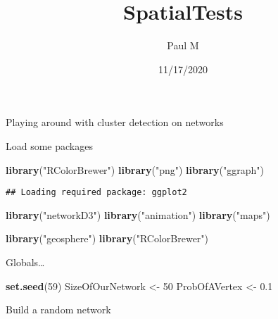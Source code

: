 \documentclass[]{article}
\title{SpatialTests}
\author{Paul M}
\date{11/17/2020}
\newenvironment{Shaded}{\begin{snugshade}}{\end{snugshade}}
\newcommand{\DecValTok}[1]{\textcolor[rgb]{0.00,0.00,0.81}{#1}}
\newcommand{\FloatTok}[1]{\textcolor[rgb]{0.00,0.00,0.81}{#1}}
\newcommand{\KeywordTok}[1]{\textcolor[rgb]{0.13,0.29,0.53}{\textbf{#1}}}
\newcommand{\NormalTok}[1]{#1}
\newcommand{\StringTok}[1]{\textcolor[rgb]{0.31,0.60,0.02}{#1}}
\begin{document}
\maketitle

Playing around with cluster detection on networks

Load some packages

\begin{Shaded}
\begin{Highlighting}[]
\KeywordTok{library}\NormalTok{(}\StringTok{"RColorBrewer"}\NormalTok{) }
\KeywordTok{library}\NormalTok{(}\StringTok{"png"}\NormalTok{)}
\KeywordTok{library}\NormalTok{(}\StringTok{"ggraph"}\NormalTok{)}
\end{Highlighting}
\end{Shaded}

\begin{verbatim}
## Loading required package: ggplot2
\end{verbatim}

\begin{Shaded}
\begin{Highlighting}[]
\KeywordTok{library}\NormalTok{(}\StringTok{"networkD3"}\NormalTok{)}
\KeywordTok{library}\NormalTok{(}\StringTok{"animation"}\NormalTok{)}
\KeywordTok{library}\NormalTok{(}\StringTok{"maps"}\NormalTok{)}

\KeywordTok{library}\NormalTok{(}\StringTok{"geosphere"}\NormalTok{)}
\KeywordTok{library}\NormalTok{(}\StringTok{"RColorBrewer"}\NormalTok{)}
\end{Highlighting}
\end{Shaded}

Globals\ldots{}

\begin{Shaded}
\begin{Highlighting}[]
\KeywordTok{set.seed}\NormalTok{(}\DecValTok{59}\NormalTok{)}
\NormalTok{SizeOfOurNetwork <-}\StringTok{ }\DecValTok{50}
\NormalTok{ProbOfAVertex <-}\StringTok{ }\FloatTok{0.1}
\end{Highlighting}
\end{Shaded}

Build a random network
\end{document}
